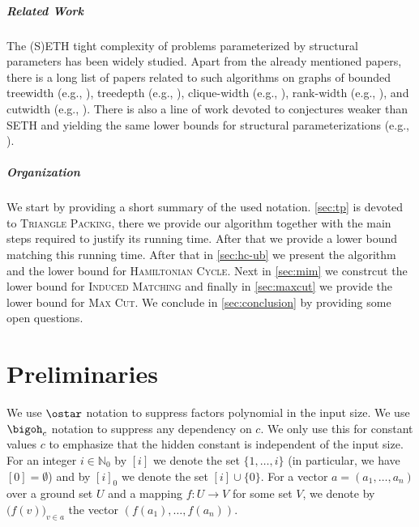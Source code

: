 \documentclass[a4paper,UKenglish,cleveref, autoref, thm-restate]{lipics-v2021}
\begin{document}
\subparagraph{Related Work}  
The (S)ETH tight complexity of problems parameterized by structural parameters has been widely studied.
Apart from the already mentioned papers, there is a long list of papers related to such algorithms on graphs of bounded treewidth (e.g., \cite{DBLP:conf/iwpec/BorradaileL16,DBLP:conf/soda/CurticapeanLN18,DBLP:conf/soda/CurticapeanM16,DBLP:journals/talg/CyganNPPRW22,DBLP:journals/corr/abs-2210-10677/EsmerFMR22,DBLP:conf/soda/FockeMINSSW23,DBLP:conf/soda/FockeMR22,DBLP:journals/dam/KatsikarelisLP22,DBLP:conf/esa/OkrasaPR20,DBLP:journals/siamcomp/OkrasaR21}), treedepth (e.g., \cite{HegerfeldK20,DBLP:journals/dam/KatsikarelisLP19,DBLP:journals/dam/KatsikarelisLP22,NederlofPSW20}), clique-width (e.g., \cite{DBLP:journals/tcs/BergougnouxK19,DBLP:journals/siamdm/BergougnouxK21,DBLP:journals/corr/abs-2307-14264/BojikianK23,DBLP:conf/icalp/GanianHKOS22,DBLP:conf/esa/HegerfeldK23,DBLP:journals/dam/KatsikarelisLP19,DBLP:journals/siamdm/Lampis20}), rank-width (e.g., \cite{DBLP:conf/stacs/BergougnouxKN23,Bui-XuanTV10}), and cutwidth (e.g., \cite{DBLP:conf/stacs/BojikianCHK23,DBLP:conf/icalp/MarxSS21}).
There is also a line of work devoted to conjectures weaker than SETH and yielding the same lower bounds for structural parameterizations (e.g., \cite{canesmer_et_al:LIPIcs.ICALP.2024.34,DBLP:conf/soda/Lampis25,lampis2024circuitsbackdoorsshadesseth}). 

\subparagraph{Organization}  
We start by providing a short summary of the used notation.
\cref{sec:tp} is devoted to \textsc{Triangle Packing}, there we provide our algorithm together with the main steps required to justify its running time.
After that we provide a lower bound matching this running time.
After that in
\cref{sec:hc-ub}
we present the 
algorithm and 
the lower bound 
for \textsc{Hamiltonian Cycle}.
Next in \cref{sec:mim} we constrcut the lower bound for \textsc{Induced Matching} and finally in \cref{sec:maxcut} we provide the lower bound for \textsc{Max Cut}.
We conclude in \cref{sec:conclusion} by providing some open questions.


\section{Preliminaries}
We use $\ostar$ notation to suppress factors polynomial in the input size.
We use $\bigoh_c$ notation to suppress any dependency on $c$. We only use this for constant values $c$ to emphasize that the hidden constant is independent of the input size.
For an integer $i \in \mathbb{N}_0$ by $[i]$ we denote the set $\{1, \dots, i\}$ (in particular, we have $[0] = \emptyset$) and by $[i]_0$ we denote the set $[i] \cup \{0\}$.
For a vector $a= (a_1, \dots, a_n)$ over a ground set $U$ and a mapping $f:U\rightarrow V$ for some set $V$, we denote by $\big(f(v)\big)_{v \in a}$ the vector $(f(a_1), \dots, f(a_n))$. 
\end{document}
